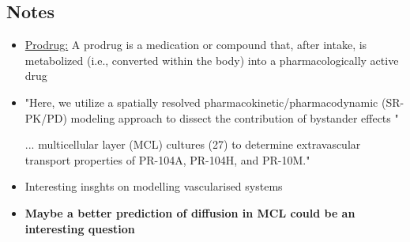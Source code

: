 \documentclass[11pt,a4paper]{article}
\begin{document}
\subsection*{Notes}
\begin{itemize}
\item \underline{Prodrug:} A prodrug is a medication or compound that, after intake, is metabolized (i.e., converted within the body) into a pharmacologically active drug
\item "Here, we utilize a spatially resolved pharmacokinetic/pharmacodynamic (SR-PK/PD) modeling approach to dissect the contribution of bystander effects "
\item [...]multicellular layer (MCL) cultures (27) to determine extravascular transport properties of PR-104A, PR-104H, and PR-10M."
\item Interesting insghts on modelling vascularised systems
\item \textbf{Maybe a better prediction of diffusion in MCL could be an interesting question}
\end{itemize}
\end{document}
